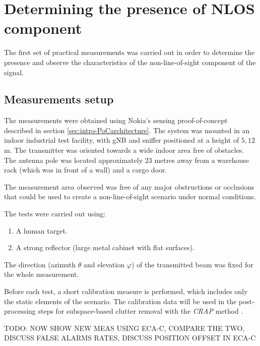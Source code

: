 \chapter{Determining the presence of NLOS component}

The first set of practical measurements was carried out in order to determine the presence and observe the characteristics of the non-line-of-sight component of the signal. 

\section{Measurements setup}
\label{sec:Test1_meas_scenario}

The measurements were obtained using Nokia's sensing proof-of-concept described in section \ref{sec:intro-PoCarchitecture}. The system was mounted in an indoor industrial test facility, with gNB and sniffer positioned at a height of $5,12$ m. The transmitter was oriented towards a wide  indoor area free of obstacles. The antenna pole was located approximately 23 metres away from a warehouse rack (which was in front of a wall) and a cargo door.

The measurement area observed was free of any major obstructions or occlusions that could be used to create a non-line-of-sight scenario under normal conditions. 
 


The tests were carried out using:

\begin{enumerate}
	\item A human target.
	\item A strong reflector (large metal cabinet with flat surfaces).
\end{enumerate}

The direction (azimuth $\theta$ and elevation $\varphi$) of the transmitted beam was fixed for the whole measurement.

Before each test, a short calibration measure is performed, which includes only the static elements of the scenario. The calibration data will be used in the post-processing steps for subspace-based clutter removal with the \textit{CRAP} method  \cite{Henninger_CRAP_2023}. 

\alert{TODO: NOW SHOW NEW MEAS USING ECA-C, COMPARE THE TWO, DISCUSS FALSE ALARMS RATES, DISCUSS POSITION OFFSET IN ECA-C}


